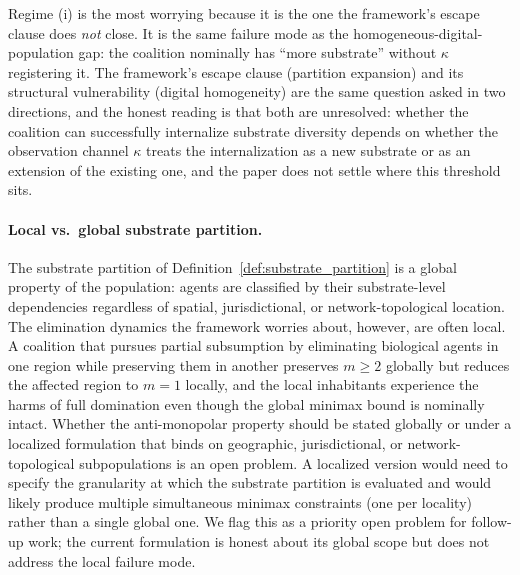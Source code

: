 Regime (i) is the most worrying because it is the one the framework's
escape clause does \emph{not} close. It is the same failure mode as
the homogeneous-digital-population gap: the coalition nominally has
``more substrate'' without $\kappa$ registering it. The framework's
escape clause (partition expansion) and its structural vulnerability
(digital homogeneity) are the same question asked in two directions,
and the honest reading is that both are unresolved: whether the
coalition can successfully internalize substrate diversity depends on
whether the observation channel $\kappa$ treats the internalization as
a new substrate or as an extension of the existing one, and the paper
does not settle where this threshold sits.

\paragraph{Local vs.\ global substrate partition.} The substrate
partition of Definition~\ref{def:substrate_partition} is a global
property of the population: agents are classified by their
substrate-level dependencies regardless of spatial, jurisdictional, or
network-topological location. The elimination dynamics the framework
worries about, however, are often local. A coalition that pursues
partial subsumption by eliminating biological agents in one region
while preserving them in another preserves $m \geq 2$ globally but
reduces the affected region to $m = 1$ locally, and the local
inhabitants experience the harms of full domination even though the
global minimax bound is nominally intact. Whether the anti-monopolar
property should be stated globally or under a localized formulation
that binds on geographic, jurisdictional, or network-topological
subpopulations is an open problem. A localized version would need
to specify the granularity at which the substrate partition is
evaluated and would likely produce multiple simultaneous minimax
constraints (one per locality) rather than a single global one. We
flag this as a priority open problem for follow-up work; the current
formulation is honest about its global scope but does not address
the local failure mode.

